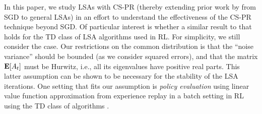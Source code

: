 In this paper, we study LSAs with CS-PR (thereby extending prior work by \citet{bach} from SGD to general LSAs) 
in an effort to understand the effectiveness of the CS-PR technique beyond SGD.
Of particular interest is whether a similar result to that  \citet{bach} holds
for the TD class of LSA algorithms used in RL.
For simplicity, we still consider the \iid case. Our restrictions on the common distribution is that the ``noise variance'' should be bounded (as we consider squared errors), and that the matrix $\mathbf{E}[A_t]$ must be Hurwitz, i.e., all its eigenvalues have positive real parts. This latter assumption can be shown to be necessary for the stability of the LSA iterations. 
One setting that fits our assumption is \emph{policy evaluation} \cite{dann} using linear value function approximation from experience replay \cite{lin} in a batch setting \cite{lange} in RL using the TD class of algorithms \cite{sutton,konda-tsitsiklis,gtd,gtd2,gtdmp}. 


